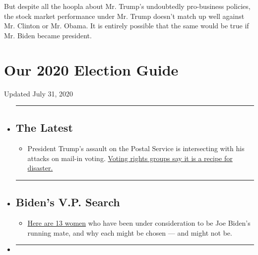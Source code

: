But despite all the hoopla about Mr. Trump's undoubtedly pro-business
policies, the stock market performance under Mr. Trump doesn't match up
well against Mr. Clinton or Mr. Obama. It is entirely possible that the
same would be true if Mr. Biden became president.

\hypertarget{our-2020-election-guide}{%
\section{Our 2020 Election Guide}\label{our-2020-election-guide}}

Updated July 31, 2020

\begin{itemize}
\item
  \begin{center}\rule{0.5\linewidth}{\linethickness}\end{center}

  \hypertarget{the-latest}{%
  \subsection{The Latest}\label{the-latest}}

  \begin{itemize}
  \tightlist
  \item
    President Trump's assault on the Postal Service is intersecting with
    his attacks on mail-in voting.
    \href{https://www.nytimes.com/2020/07/31/us/politics/trump-usps-mail-delays.html?action=click\&pgtype=Article\&state=default\&region=BELOW_MAIN_CONTENT\&context=storylines_guide}{Voting
    rights groups say it is a recipe for disaster.}
  \end{itemize}
\item
  \begin{center}\rule{0.5\linewidth}{\linethickness}\end{center}

  \hypertarget{bidens-vp-search}{%
  \subsection{Biden's V.P. Search}\label{bidens-vp-search}}

  \begin{itemize}
  \tightlist
  \item
    \href{https://www.nytimes.com/article/biden-vice-president-2020.html?action=click\&pgtype=Article\&state=default\&region=BELOW_MAIN_CONTENT\&context=storylines_guide}{Here
    are 13 women} who have been under consideration to be Joe Biden's
    running mate, and why each might be chosen --- and might not be.
  \end{itemize}
\item
  \begin{center}\rule{0.5\linewidth}{\linethickness}\end{center}


\end{itemize}
